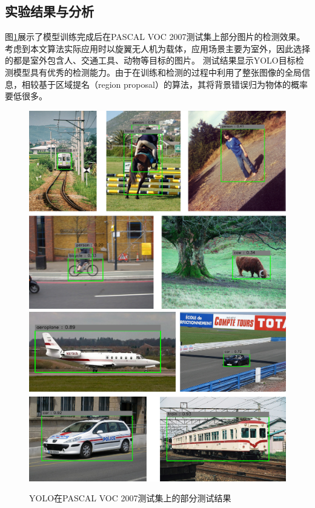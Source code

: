 \subsection{实验结果与分析}
图\ref{fig:3_3_测试结果}展示了模型训练完成后在PASCAL VOC 2007测试集上部分图片的检测效果。 考虑到本文算法实际应用时以旋翼无人机为载体，应用场景主要为室外，因此选择的都是室外包含人、交通工具、动物等目标的图片。
测试结果显示YOLO目标检测模型具有优秀的检测能力。由于在训练和检测的过程中利用了整张图像的全局信息，相较基于区域提名（region proposal）的算法，其将背景错误归为物体的概率要低很多。
\begin{figure}[htbp] %
	\centering
	\includegraphics[width=6in]{figures/3_3_voc2007_test_result1}\vspace{.1in}
	\includegraphics[width=6in]{figures/3_3_voc2007_test_result2}
	\caption{YOLO在PASCAL VOC 2007测试集上的部分测试结果}\label{fig:3_3_测试结果}
\end{figure}

